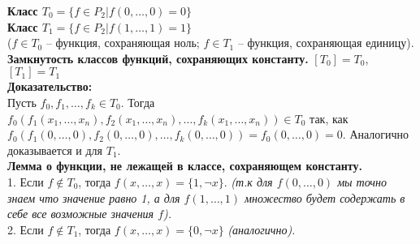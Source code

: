 \textbf{Класс $T_0 = \{f \in P_2 | f(0, \ldots, 0) = 0\}$}\\

\textbf{Класс $T_1 = \{f \in P_2 | f(1, \ldots, 1) = 1\}$}\\

($f \in T_0$ -- функция, сохраняющая ноль; $f \in T_1$ -- функция, сохраняющая единицу).\\

\textbf{Замкнутость классов функций, сохраняющих константу.} $[T_0] = T_0$, $[T_1] = T_1$\\

\noindent \textbf{Доказательство:}\\

Пусть $f_0, f_1, \ldots, f_k \in T_0$. Тогда $f_0 (f_1(x_1, \ldots, x_n), f_2(x_1, \ldots, x_n), \ldots, f_k(x_1, \ldots, x_n)) \in T_0$ так, как $f_0 (f_1 (0, \ldots, 0), f_2 (0, \ldots, 0), \ldots, f_k (0, \ldots, 0)) = f_0 (0, \ldots, 0) = 0$.
Аналогично доказывается и для $T_1$.\\

\textbf{Лемма о функции, не лежащей в классе, сохраняющем константу.}\\

1. Если $f \notin T_0$, тогда $f (x, \ldots, x) = \{1, \neg x\}$. \textit{(т.к для $f (0, \ldots, 0)$ мы точно знаем что значение равно 1, а для $f (1, \ldots, 1)$ множество будет содержать в себе все возможные значения $f$).}\\

2. Если $f \notin T_1$, тогда $f (x, \ldots, x) = \{0, \neg x\}$ \textit {(аналогично).}
